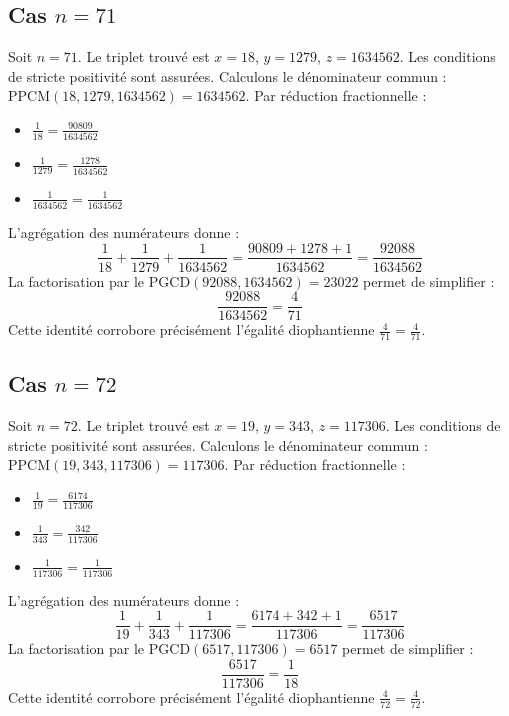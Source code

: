 \documentclass[11pt,a4paper]{article}
\begin{document}
\subsection{Cas $n = 71$}
Soit $n = 71$. Le triplet trouvé est $x = 18$, $y = 1279$, $z = 1634562$.
Les conditions de stricte positivité sont assurées.
Calculons le dénominateur commun : $\text{PPCM}(18, 1279, 1634562) = 1634562$.
Par réduction fractionnelle :
\begin{itemize}
    \item $\frac{1}{18} = \frac{90809}{1634562}$
    \item $\frac{1}{1279} = \frac{1278}{1634562}$
    \item $\frac{1}{1634562} = \frac{1}{1634562}$
\end{itemize}
L'agrégation des numérateurs donne :
$$ \frac{1}{18} + \frac{1}{1279} + \frac{1}{1634562} = \frac{90809 + 1278 + 1}{1634562} = \frac{92088}{1634562} $$
La factorisation par le $\text{PGCD}(92088, 1634562) = 23022$ permet de simplifier :
$$ \frac{92088}{1634562} = \frac{4}{71} $$
Cette identité corrobore précisément l'égalité diophantienne $\frac{4}{71} = \frac{4}{71}$.

\subsection{Cas $n = 72$}
Soit $n = 72$. Le triplet trouvé est $x = 19$, $y = 343$, $z = 117306$.
Les conditions de stricte positivité sont assurées.
Calculons le dénominateur commun : $\text{PPCM}(19, 343, 117306) = 117306$.
Par réduction fractionnelle :
\begin{itemize}
    \item $\frac{1}{19} = \frac{6174}{117306}$
    \item $\frac{1}{343} = \frac{342}{117306}$
    \item $\frac{1}{117306} = \frac{1}{117306}$
\end{itemize}
L'agrégation des numérateurs donne :
$$ \frac{1}{19} + \frac{1}{343} + \frac{1}{117306} = \frac{6174 + 342 + 1}{117306} = \frac{6517}{117306} $$
La factorisation par le $\text{PGCD}(6517, 117306) = 6517$ permet de simplifier :
$$ \frac{6517}{117306} = \frac{1}{18} $$
Cette identité corrobore précisément l'égalité diophantienne $\frac{4}{72} = \frac{4}{72}$.
\end{document}
